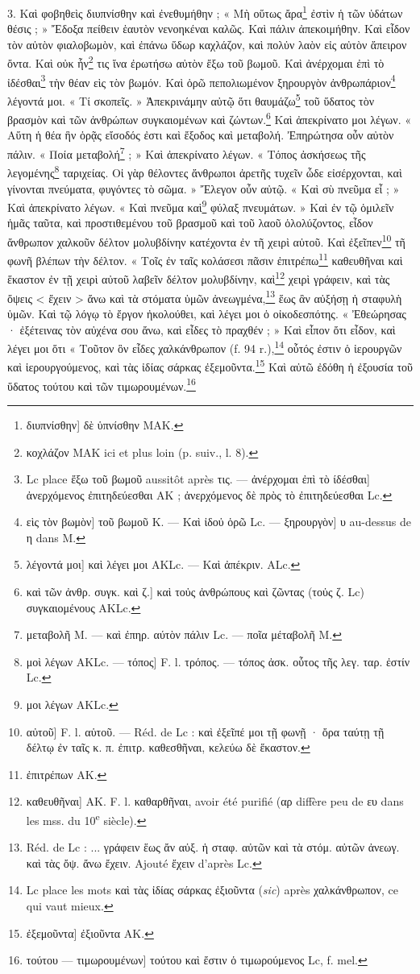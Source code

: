 \documentclass[landscape, a4paper, 11pt, oneside, polutonikogreek, french]{article}
\begin{document}
3. Καὶ φοβηθεὶς διυπνίσθην καὶ ἐνεθυμήθην ; « Μὴ οὕτως ἄρα\footnote{διυπνίσθην] δὲ ὑπνίσθην MAK.} ἐστὶν ἡ τῶν ὑδάτων θέσις ; » Ἔδοξα πείθειν ἑαυτὸν νενοηκέναι καλῶς. Καὶ πάλιν ἀπεκοιμήθην. Καὶ εἶδον τὸν αὐτὸν φιαλοβωμὸν, καὶ ἐπάνω ὕδωρ καχλάζον, καὶ πολὐν λαὸν εἰς αὐτὸν ἄπειρον ὄντα. Καὶ οὐκ ἧν\footnote{κοχλάζον MAK ici et plus loin (p. suiv., l. 8).} τις ἵνα ἐρωτήσω αὐτὸν ἔξω τοῦ βωμοῦ. Καὶ ἀνέρχομαι ἐπὶ τὸ ἰδέσθαι\footnote{Lc place ἔξω τοῦ βωμοῦ aussitôt après τις. --- ἀνέρχομαι ἐπὶ τὸ ίδέσθαι] ἀνερχόμενος ἐπιτηδεύεσθαι AK ; ἀνερχόμενος δὲ πρὸς τὸ ἐπιτηδεύεσθαι Lc.} τὴν θέαν εὶς τὸν βωμόν. Καὶ ὁρῶ πεπολιωμένον ξηρουργὸν ἀνθρωπάριον\footnote{εὶς τὸν βωμὸν] τοῦ βωμοῦ K. --- Καὶ ἰδοὐ ὁρῶ Lc. --- ξηρουργὸν] υ au-dessus de η dans M.} λέγοντά μοι. « Τί σκοπεῖς. » Ἀπεκρινάμην αὐτῷ ὅτι θαυμάζω\footnote{λέγοντά μοι] καὶ λέγει μοι AKLc. --- Καὶ ἀπέκριν. ALc.} τοῦ ὕδατος τὸν βρασμὸν καὶ τῶν ἀνθρώπων συγκαιομένων καὶ ζώντων.\footnote{καὶ τῶν ἀνθρ. συγκ. καὶ ζ.] καὶ τοὐς ἀνθρώπους καὶ ζῶντας (τοὐς ζ. Lc) συγκαιομένους AKLc.} Καὶ ἀπεκρίνατο μοι λέγων. « Αὕτη ἡ θέα ἣν ὁρᾷς εἴσοδός ἐστι καὶ ἔξοδος καὶ μεταβολή. Ἐπηρώτησα οὖν αὐτὸν πάλιν. « Ποία μεταβολή\footnote{μεταβολῆ M. --- καὶ ἐπηρ. αύτὸν πάλιν Lc. --- ποῖα μέταβολῆ M.} ; » Καὶ ἀπεκρίνατο λέγων. « Τόπος ἀσκήσεως τῆς λεγομένης\footnote{μοὶ λέγων AKLc. --- τόπος] F. l. τρόπος. --- τόπος ἀσκ. οὗτος τῆς λεγ. ταρ. ἐστίν Lc.} ταριχείας. Οἱ γὰρ θέλοντες ἄνθρωποι ἀρετῆς τυχεῖν ὧδε εἰσέρχονται, καὶ γίνονται πνεύματα, φυγόντες τὸ σῶμα. » Ἔλεγον οὖν αὐτῷ. « Καὶ σὺ πνεῦμα εἶ ; » Καὶ ἀπεκρίνατο λέγων. « Καὶ πνεῦμα καὶ\footnote{μοι λέγων AKLc.} φύλαξ πνευμάτων. » Καὶ ἐν τῷ ὁμιλεῖν ἡμᾶς ταῦτα, καὶ προστιθεμένου τοῦ βρασμοῦ καὶ τοῦ λαοῦ ὁλολύζοντος, εἶδον ἄνθρωπον χαλκοῦν δέλτον μολυβδίνην κατέχοντα ἐν τῆ χειρὶ αὐτοῦ. Καὶ ἐξεῖπεν\footnote{αὐτοῦ] F. l. αὑτοῦ. --- Réd. de Lc : καὶ ἐξεῖπέ μοι τῇ φωνῇ · ὄρα ταύτῃ τῇ δέλτῳ ἐν ταῖς κ. π. ἐπιτρ. καθεσθῆναι, κελεύω δὲ ἕκαστον.} τῆ φωνῆ βλέπων τὴν δέλτον. « Τοῖς ἐν ταῖς κολάσεσι πᾶσιν ἐπιτρέπω\footnote{ἐπιτρέπων AK.} καθευθῆναι καὶ ἕκαστον ἐν τῇ χειρὶ αὐτοῦ λαβεῖν δέλτον μολυβδίνην, καὶ\footnote{καθευθῆναι] AK. F. l. καθαρθῆναι, avoir été purifié (αρ diffère peu de ευ dans les mss. du 10\textsuperscript{e} siècle).} χειρὶ γράφειν, καὶ τὰς ὄψεις < ἔχειν > ἄνω καὶ τὰ στόματα ὑμῶν ἀνεωγμένα,\footnote{Réd. de Lc : ... γράφειν ἕως ἄν αὐξ. ἡ σταφ. αὐτῶν καὶ τὰ στόμ. αὐτῶν ἀνεωγ. καὶ τὰς ὄψ. ἄνω ἔχειν. Ajouté ἔχειν d'après Lc.} ἕως ἂν αὐξήσῃ ἡ σταφυλὴ ὑμῶν. Καὶ τῷ λόγῳ τὸ ἔργον ἠκολούθει, καὶ λέγει μοι ὁ οἰκοδεσπότης. « Ἐθεώρησας · ἐξέτεινας τὸν αὐχένα σου ἄνω, καὶ εἶδες τὸ πραχθέν ; » Καὶ εἶπον ὄτι εἶδον, καὶ λέγει μοι ὅτι « Τοῦτον ὃν εἶδες χαλκάνθρωπον (f. 94 r.),\footnote{Lc place les mots καὶ τὰς ἰδίας σάρκας ἐξιοῦντα (\emph{sic}) après χαλκάνθρωπον, ce qui vaut mieux.} οὗτός ἐστιν ὁ ἱερουργῶν καὶ ἱερουργούμενος, καὶ τὰς ἰδίας σάρκας ἐξεμοῦντα.\footnote{ἐξεμοῦντα] ἐξιοῦντα AK.} Καὶ αὐτῶ ἐδόθη ἡ ἐξουσία τοῦ ὕδατος τούτου καὶ τῶν τιμωρουμένων.\footnote{τούτου --- τιμωρουμένων] τούτου καὶ ἔστιν ὁ τιμωρούμενος Lc, f. mel.}
\end{document}
